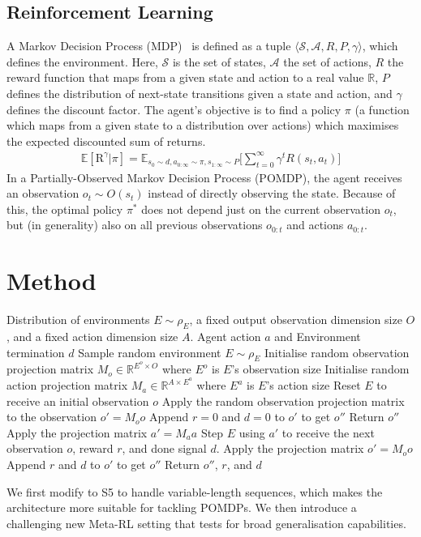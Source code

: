 \documentclass{article}
\begin{document}
\subsection{Reinforcement Learning}
\label{subsect:rl-background}
A Markov Decision Process (MDP)~\citep{sutton2018reinforcement} is defined as a tuple $\langle \mathcal{S}, \mathcal{A}, R, P, \gamma\rangle$, which defines the environment. Here, $\mathcal{S}$ is the set of states, $\mathcal{A}$ the set of actions, $R$ the reward function that maps from a given state and action to a real value $\mathbb{R}$, $P$ defines the distribution of next-state transitions given a state and action, and $\gamma$ defines the discount factor. The agent's objective is to find a policy $\pi$ (a function which maps from a given state to a distribution over actions) which maximises the expected discounted sum of returns.
\begin{align}
     \mathbb{E}[\text{R}^{\gamma} | \pi] = \mathbb{E}_{s_0\sim d, a_{0:\infty}\sim\pi, s_{1:\infty}\sim P}\Big[
    \sum_{t=0}^{\infty}\gamma^t R(s_t, a_t) \Big] \nonumber
\end{align}
In a Partially-Observed Markov Decision Process (POMDP), the agent receives an observation $o_t \sim O(s_t)$ instead of directly observing the state. Because of this, the optimal policy $\pi^*$ does not depend just on the current observation $o_t$, but (in generality) also on all previous observations $o_{0:t}$ and actions $a_{0:t}$.
\section{Method}
\label{sec:Method}
\begin{algorithm}[t]
   \caption{Pseudocode for the Multi-Environment Meta-Learning environment step.
}
   \label{alg:wrapper-code}
\begin{algorithmic}[1]
   \REQUIRE Distribution of environments $E \sim \rho_E$, a fixed output observation dimension size $O$, and a fixed action dimension size $A$. Agent action $a$ and Environment termination $d$
   \STATE Sample random environment $E \sim \rho_E$
   \STATE Initialise random observation projection matrix $M_o \in \mathbb{R}^{E^o \times O}$ where $E^o$ is $E$'s observation size
   \STATE Initialise random action projection matrix
   $M_a \in \mathbb{R}^{A \times E^a}$ where $E^a$ is $E$'s action size
   \STATE Reset $E$ to receive an initial observation $o$
   \STATE Apply the random observation projection matrix to the observation $o'=M_oo$
   \STATE Append $r=0$ and $d=0$ to $o'$ to get $o''$
   \STATE Return $o''$
   \ELSE
   \STATE Apply the projection matrix $a' = M_aa$
   \STATE Step $E$ using $a'$ to receive the next observation $o$, reward $r$, and done signal $d$.
   \STATE Apply the projection matrix $o'=M_oo$
   \STATE Append $r$ and $d$ to $o'$ to get $o''$
   \STATE Return $o''$, $r$, and $d$
   \ENDIF
   \ENDFUNCTION
\end{algorithmic}
\end{algorithm}
We first modify to S5 to handle variable-length sequences, which makes the architecture more suitable for tackling POMDPs. We then introduce a challenging new  Meta-RL setting that tests for broad generalisation capabilities.
\end{document}
